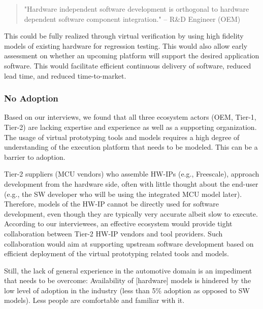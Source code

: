 \begin{quote}
"Hardware independent software development is orthogonal to hardware dependent software component integration."
-- R&D Engineer (OEM)
\end{quote}

This could be fully realized through virtual verification by using high fidelity models of existing hardware for regression testing. This would also allow early assessment on whether an upcoming platform will support the desired application software. This would facilitate efficient continuous delivery of software, reduced lead time, and reduced time-to-market.

\subsubsection{No Adoption}
Based on our interviews, we found that all three ecosystem actors (OEM, Tier-1, Tier-2) are lacking expertise and experience as well as a supporting organization.
The usage of virtual prototyping tools and models requires a high degree of understanding of the execution platform that needs to be modeled. This can be a barrier to adoption.

Tier-2 suppliers (MCU vendors) who assemble HW-IPs (e.g., Freescale), approach development from the hardware side, often with little thought about the end-user (e.g., the SW developer who will be using the integrated MCU model later). Therefore, models of the HW-IP cannot be directly used for software development, even though they are typically very accurate albeit slow to execute. According to our interviewees, an effective ecosystem would provide tight collaboration between Tier-2 HW-IP vendors and tool providers. Such collaboration would aim at supporting upstream software development based on efficient deployment of the virtual prototyping related tools and models.

Still, the lack of general experience in the automotive domain is an impediment that needs to be overcome:
Availability of [hardware] models is hindered by the low level of adoption in the industry (less than 5\% adoption as opposed to SW models). Less people are comfortable and familiar with it.

